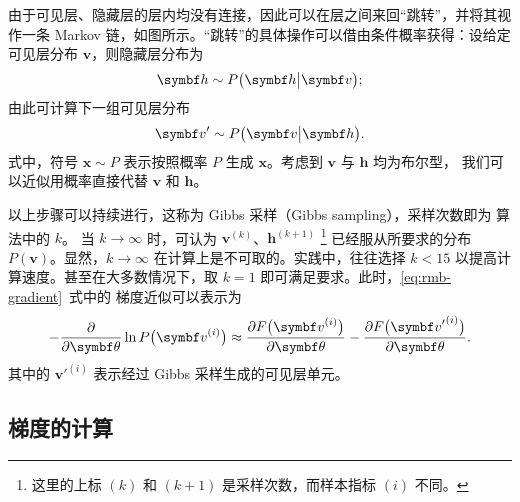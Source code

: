 由于可见层、隐藏层的层内均没有连接，因此可以在层之间来回“跳转”，并将其视作一条 Markov 链，如图所示。“跳转”的具体操作可以借由条件概率获得：设给定可见层分布 $\bm{v}$，则隐藏层分布为
\begin{equation}
  \label{eq:hidden-layer-dist}
  \bm{h} \sim P\qty\big(\bm{h}\big|\bm{v});
\end{equation}
由此可计算下一组可见层分布
\begin{equation}
  \label{eq:visible-layer-dist}
  \bm{v}' \sim P\qty\big(\bm{v}\big|\bm{h}).
\end{equation}
式中，符号 $\bm{x}\sim P$ 表示按照概率 $P$ 生成 $\bm{x}$。考虑到 $\bm{v}$ 与 $\bm{h}$ 均为布尔型，
我们可以近似用概率直接代替 $\bm{v}$ 和 $\bm{h}$。

以上步骤可以持续进行，这称为 Gibbs 采样（Gibbs sampling），采样次数即为 \CDk{} 算法中的 $k$。
当 $k\to\infty$ 时，可认为 $\bm{v}^{(k)}$、$\bm{h}^{(k+1)}$
\footnote{这里的上标 $(k)$ 和 $(k+1)$ 是采样次数，而样本指标 $(i)$ 不同。}
已经服从所要求的分布 $P(\bm{v})$。显然，$k\to\infty$ 在计算上是不可取的。实践中，往往选择 $k<15$
以提高计算速度。甚至在大多数情况下，取 $k=1$ 即可满足要求。此时，\eqref{eq:rmb-gradient}~式中的
梯度近似可以表示为
\begin{equation}
  \label{eq:rmb-gradient-approx}
  - \pdv{\bm{\theta}} \ln P\qty\big(\bm{v}^{(i)})
  \approx \pdv{F\qty\big(\bm{v}^{(i)})}{\bm{\theta}}
        - \pdv{F\qty\big({\bm{v}'}^{(i)})}{\bm{\theta}}.
\end{equation}
其中的 ${\bm{v}'}^{(i)}$ 表示经过 Gibbs 采样生成的可见层单元。

\subsection{梯度的计算}


